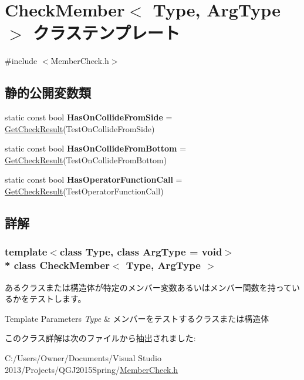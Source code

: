 \hypertarget{class_check_member}{}\section{Check\+Member$<$ Type, Arg\+Type $>$ クラステンプレート}
\label{class_check_member}


{\ttfamily \#include $<$Member\+Check.\+h$>$}

\subsection*{静的公開変数類}
\begin{DoxyCompactItemize}
\item 
static const bool {\bfseries Has\+On\+Collide\+From\+Side} = \hyperlink{_member_check_8h_a422ea6f7b3ccc3c32c0b5a735d39a842}{Get\+Check\+Result}(Test\+On\+Collide\+From\+Side)\hypertarget{class_check_member_a627c9b90cee5440ac64a92282fae9179}{}\label{class_check_member_a627c9b90cee5440ac64a92282fae9179}

\item 
static const bool {\bfseries Has\+On\+Collide\+From\+Bottom} = \hyperlink{_member_check_8h_a422ea6f7b3ccc3c32c0b5a735d39a842}{Get\+Check\+Result}(Test\+On\+Collide\+From\+Bottom)\hypertarget{class_check_member_add97cad9f5817d2a49df120d32f5f6f4}{}\label{class_check_member_add97cad9f5817d2a49df120d32f5f6f4}

\item 
static const bool {\bfseries Has\+Operator\+Function\+Call} = \hyperlink{_member_check_8h_a422ea6f7b3ccc3c32c0b5a735d39a842}{Get\+Check\+Result}(Test\+Operator\+Function\+Call)\hypertarget{class_check_member_ab7b241c6f71f68028a627750bbfb920b}{}\label{class_check_member_ab7b241c6f71f68028a627750bbfb920b}

\end{DoxyCompactItemize}


\subsection{詳解}
\subsubsection*{template$<$class Type, class Arg\+Type = void$>$\\*
class Check\+Member$<$ Type, Arg\+Type $>$}

あるクラスまたは構造体が特定のメンバー変数あるいはメンバー関数を持っているかをテストします。 
\begin{DoxyTemplParams}{Template Parameters}
{\em Type} & メンバーをテストするクラスまたは構造体 \\
\hline
\end{DoxyTemplParams}


このクラス詳解は次のファイルから抽出されました\+:\begin{DoxyCompactItemize}
\item 
C\+:/\+Users/\+Owner/\+Documents/\+Visual Studio 2013/\+Projects/\+Q\+G\+J2015\+Spring/\hyperlink{_member_check_8h}{Member\+Check.\+h}\end{DoxyCompactItemize}
